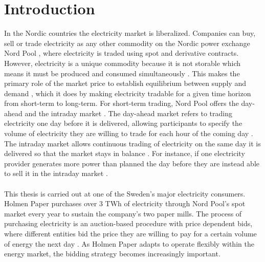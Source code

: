 \chapter{Introduction}
\label{cha:introduction}
In the Nordic countries the electricity market is liberalized. Companies can buy, sell or trade electricity as any other commodity on the Nordic power exchange Nord Pool \cite{NordPool}, where electricity is traded using spot and derivative contracts. However, electricity is a unique commodity because it is not storable which means it must be produced and consumed simultaneously \cite{LAGO2021116983}. This makes the primary role of the market price to establish equilibrium between supply and demand \cite{NordPool2}, which it does by making electricity tradable for a given time horizon from short-term to long-term. For short-term trading, Nord Pool offers the day-ahead and the intraday market \cite{history3}. The day-ahead market refers to trading electricity one day before it is delivered, allowing participants to specify the volume of electricity they are willing to trade for each hour of the coming day \cite{NordPool2}. The intraday market allows continuous trading of electricity on the same day it is delivered so that the market stays in balance \cite{NordPool_intraday}. For instance, if one electricity provider generates more power than planned the day before they are instead able to sell it in the intraday market \cite{NordPool_intraday, NordPool_priceformation}. 
\\\\
This thesis is carried out at one of the Sweden's major electricity consumers. Holmen Paper purchases over 3 TWh of electricity through Nord Pool's spot market every year to sustain the company's two paper mills. The process of purchasing electricity is an auction-based procedure with price dependent bids, where different entities bid the price they are willing to pay for a certain volume of energy the next day \cite{NordPool2}. As Holmen Paper adapts to operate flexibly within the energy market, the bidding strategy becomes increasingly important. 

